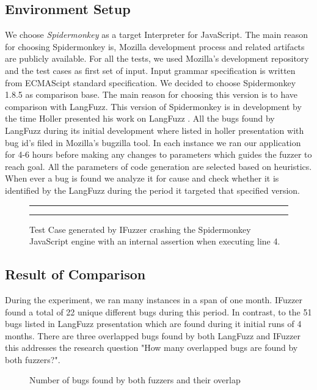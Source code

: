 \documentclass{acm_proc_article-sp}
\begin{document}
\subsection{Environment Setup}
We choose \textit{Spidermonkey} as a target Interpreter for JavaScript. The main reason for choosing Spidermonkey is, Mozilla development process and related artifacts are publicly available. For all the tests, we used Mozilla's development repository and the test cases as first set of input. Input grammar specification is written from ECMAScipt standard specification. We decided to choose Spidermonkey 1.8.5 as comparison base. The main reason for choosing this version is to have comparison with LangFuzz. This version of Spidermonkey is in development by the time Holler presented his work on LangFuzz \cite{Holler11}. All the bugs found by LangFuzz during its initial development where listed in holler presentation with bug id's filed in Mozilla's bugzilla tool. In each instance we ran our application for 4-6 hours before making any changes to parameters which guides the fuzzer to reach goal. All the parameters of code generation are selected based on heuristics. When ever a bug is found we analyze it for cause and check whether it is identified by the LangFuzz during the period it targeted that specified version.  

\begin{figure}[h]
\centering
\rule{9cm}{0.5pt}
\rule{9cm}{0.1pt}
\caption {Test Case generated by IFuzzer crashing the Spidermonkey JavaScript engine with an internal assertion when executing line 4.}
\label{fig6}
\end{figure}

\subsection{Result of Comparison}
During the experiment, we ran many instances in a span of one month. IFuzzer found  a total of 22 unique different bugs during this period. In contrast, to the 51 bugs listed in LangFuzz presentation which are found during it initial runs of 4 months. There are three overlapped bugs found by both LangFuzz and IFuzzer this addresses the research question "How many overlapped bugs are found by both fuzzers?". 

\begin{figure}[h]
\centering
{}
\caption {Number of bugs found by both fuzzers and their overlap}
\label{fig5}
\end{figure}
\end{document}
